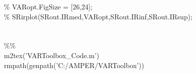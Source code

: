 \hspace{1mm}\hspace{5mm} \hspace{5mm} \hspace{5mm} \hspace{5mm} \hspace{5mm} \textcolor{matlabgreen}{\% VARopt.FigSize = [26,24]; }\\ 
\hspace{1mm}\hspace{5mm} \hspace{5mm} \hspace{5mm} \hspace{5mm} \hspace{5mm} \textcolor{matlabgreen}{\% SRirplot(SRout.IRmed,VARopt,SRout.IRinf,SRout.IRsup); }\\ 
\hspace{1mm}\hspace{5mm} \hspace{5mm} \hspace{5mm} \hspace{5mm} \hspace{5mm}  \\ 
\hspace{1mm}\hspace{5mm} \hspace{5mm} \hspace{5mm} \hspace{5mm} \hspace{5mm}  \\ 
\hspace{1mm}\hspace{5mm} \hspace{5mm} \hspace{5mm} \hspace{5mm} \hspace{5mm} \textcolor{matlabgreen}{\%}\textcolor{matlabgreen}{\% }\\ 
\hspace{1mm}\hspace{5mm} \hspace{5mm} \hspace{5mm} \hspace{5mm} \hspace{5mm} m2tex(\textcolor{matlabpurple}{'VARToolbox\_Code.m'}) \\ 
\hspace{1mm}\hspace{5mm} \hspace{5mm} \hspace{5mm} \hspace{5mm} \hspace{5mm} rmpath(genpath(\textcolor{matlabpurple}{'C:/AMPER/VARToolbox'})) \\ 
\hspace{1mm}\hspace{5mm} \hspace{5mm} \hspace{5mm} \hspace{5mm} \hspace{5mm}  \\ 
\hspace{1mm}\hspace{5mm} \hspace{5mm} \hspace{5mm} \hspace{5mm} \hspace{5mm}  \\ 
